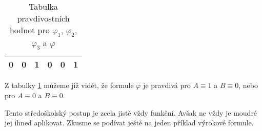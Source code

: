 \begin{example}
\begin{solution}
\begin{table}[h]
\begin{tabular}{|cc|cccc|}
            0   & 0   & 1               & 0                          & 0                    & 1                                          \\ \hline
            \end{tabular}
            \caption{Tabulka pravdivostních hodnot pro $\varphi_1$, $\varphi_2$, $\varphi_3$ a $\varphi$}
            \label{tab:ex_vyrokova_formule_1}
        \end{table}
        Z tabulky \ref{tab:ex_vyrokova_formule_1} můžeme již vidět, že formule $\varphi$ je pravdivá pro $A\equiv 1$ a $B\equiv 0$, nebo pro $A\equiv 0$ a $B\equiv 0$.
    \end{solution}
\end{example}

Tento středoškolský postup je zcela jistě vždy funkční. Avšak ne vždy je moudré jej ihned aplikovat. Zkusme se podívat ještě na jeden příklad výrokové formule.

